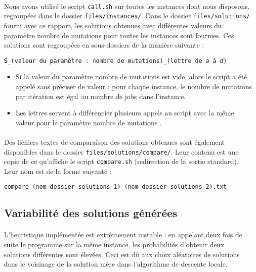\paragraph{}
Nous avons utilisé le script \texttt{call.sh} sur toutes les instances dont nous disposons, regroupées dans le dossier \texttt{files/instances/}.
Dans le dossier \texttt{files/solutions/} fourni avec ce rapport, les solutions obtenues avec différentes valeurs du paramètre \og nombre de mutations \fg{} pour toutes les instances sont fournies. Ces solutions sont regroupées en sous-dossiers de la manière suivante :
\begin{center}
\texttt{S\_(valeur du paramètre : nombre de mutations)\_(lettre de \emph{a} à \emph{d})}
\end{center}
\begin{itemize}
\item Si la valeur du paramètre \og nombre de mutations \fg{} est vide, alors le script a été appelé sans préciser de valeur :
pour chaque instance, le nombre de mutations par itération est égal au nombre de jobs dans l'instance.
\item Les lettres servent à différencier plusieurs appels au script avec la même valeur pour le paramètre \og nombre de mutations \fg{}.
\end{itemize}

\paragraph{}
Des fichiers textes de comparaison des solutions obtenues sont également disponibles dans le dossier \texttt{files/solutions/compare/}.
Leur contenu est une copie de ce qu'affiche le script \texttt{compare.sh} (redirection de la sortie standard).
Leur nom est de la forme suivante :
\begin{center}
\texttt{compare\_(nom dossier solutions 1)\_(nom dossier solutions 2).txt}
\end{center}

\subsection{Variabilité des solutions générées}

\paragraph{}
L'heuristique implémentée est extrêmement instable : en appelant deux fois de suite le programme sur la même instance, les probabilités
d'obtenir deux solutions différentes sont élevées. Ceci est dû aux choix aléatoires de solutions dans le voisinage de la solution mère
dans l'algorithme de descente locale.

